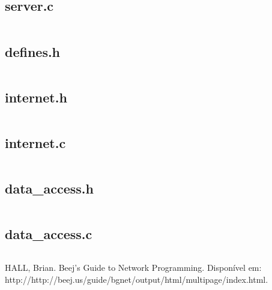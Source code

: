 \documentclass[11pt,twoside]{article}
\begin{document}
\subsection{server.c}
\begin{verbatim}
\end{verbatim}

\subsection{defines.h}
\begin{verbatim}
\end{verbatim}

\subsection{internet.h}
\begin{verbatim}
\end{verbatim}

\subsection{internet.c}
\begin{verbatim}
\end{verbatim}

\subsection{data\_access.h}
\begin{verbatim}
\end{verbatim}

\subsection{data\_access.c}
\begin{verbatim}
\end{verbatim}




\begin{thebibliography}{99}
 HALL, Brian. Beej's Guide to Network Programming. Disponível em: http://http://beej.us/guide/bgnet/output/html/multipage/index.html.
\end{thebibliography}
\end{document}
